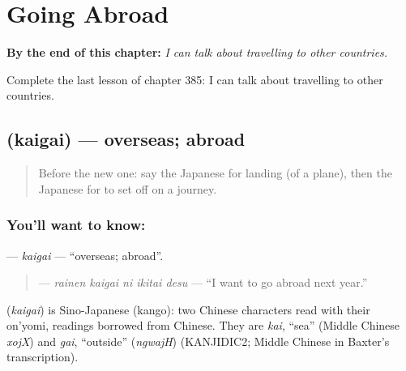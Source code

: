 
\chapter{Going Abroad}
\label{ch:ja-going-abroad}

\begin{chapteropening}
\textbf{By the end of this chapter:} \emph{I can talk about travelling to other countries.}

Complete the last lesson of chapter 385: I can talk about travelling to other countries.
\end{chapteropening}

\section[\texorpdfstring{\ja{かいがい} (kaigai)}{かいがい (kaigai)}]{ (kaigai) — overseas; abroad}

\label{lesson:JA-C385-kaigai}



\begin{quote}
Before the new one: say the Japanese for landing (of a plane), then the Japanese for to set off on a journey.
\end{quote}

\subsection*{You'll want to know: }
\textbf{} — \emph{kaigai} — \textquotedblleft{}overseas; abroad\textquotedblright{}.

\begin{quote}
\textbf{  } — \emph{rainen kaigai ni ikitai desu} — \textquotedblleft{}I want to go abroad next year.\textquotedblright{}
\end{quote}

\begin{cousinweb}
\textbf{} (\emph{kaigai}) is Sino-Japanese (kango): two Chinese characters read with their on'yomi, readings borrowed from Chinese. They are \emph{kai}, \textquotedblleft{}sea\textquotedblright{} (Middle Chinese \emph{xojX}) and \emph{gai}, \textquotedblleft{}outside\textquotedblright{} (\emph{ngwajH}) (KANJIDIC2; Middle Chinese in Baxter's transcription).
\end{cousinweb}

